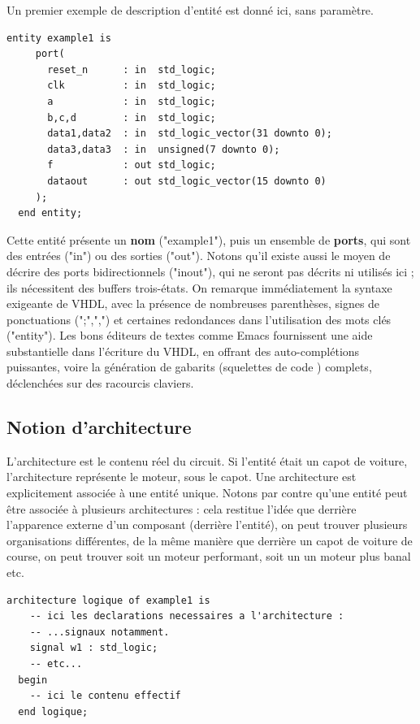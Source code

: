 Un premier exemple de description d'entité est donné ici, sans paramètre.
\lstset{language=VHDL}
\begin{lstlisting}[frame=single]
  entity example1 is
     port(
       reset_n      : in  std_logic;
       clk          : in  std_logic;
       a            : in  std_logic;
       b,c,d        : in  std_logic;
       data1,data2  : in  std_logic_vector(31 downto 0);
       data3,data3  : in  unsigned(7 downto 0);
       f            : out std_logic;
       dataout      : out std_logic_vector(15 downto 0)
     );
  end entity;
\end{lstlisting}
Cette entité présente un \textbf{nom} ("example1"), puis un ensemble de \textbf{ports}, qui sont des entrées ("in") ou des sorties ("out"). Notons qu'il existe aussi
le moyen de décrire des ports bidirectionnels ("inout"), qui ne seront pas décrits ni utilisés ici ; ils nécessitent des buffers trois-états. On remarque immédiatement
la syntaxe exigeante de VHDL, avec la présence de nombreuses parenthèses, signes de ponctuations (";",",")  et certaines redondances dans l'utilisation des mots clés ("entity").
Les bons éditeurs de textes comme Emacs fournissent une aide substantielle dans l'écriture du VHDL, en offrant des auto-complétions puissantes, voire la génération de gabarits (squelettes de
code ) complets, déclenchées sur des racourcis claviers.

\subsection{Notion d'architecture}
L'architecture est le contenu réel du circuit. Si l'entité était un capot de voiture, l'architecture représente le moteur, sous le capot.
Une architecture est explicitement associée à une entité unique. Notons par contre qu'une entité peut être associée à plusieurs architectures : cela restitue l'idée que derrière l'apparence externe d'un composant (derrière l'entité), on peut
trouver plusieurs organisations différentes, de la même manière que derrière un capot de voiture de course, on peut trouver soit un moteur performant, soit un un moteur plus banal etc.

\begin{lstlisting}[frame=single]
  architecture logique of example1 is
    -- ici les declarations necessaires a l'architecture :
    -- ...signaux notamment.
    signal w1 : std_logic;
    -- etc...
  begin
    -- ici le contenu effectif
  end logique;
\end{lstlisting}

